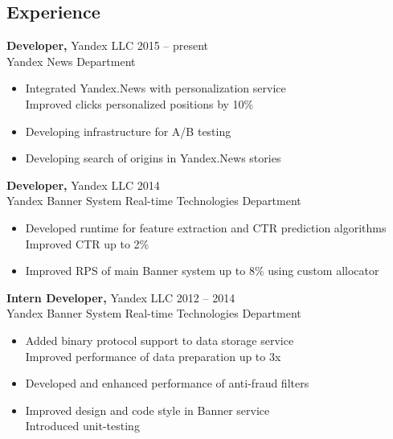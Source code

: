 \documentclass[margin]{res}
\begin{document}

\address{{\bf Contact info} \\ 1 Ambulatornyy pr-d, 5-2-40, Moscow, 125315  \\
+7 (915) 264-55-06 \\ tanyatik@yandex.ru, tanyatik1@gmail.com}


\begin{resume}



\section{Experience}
{\bf Developer,} Yandex LLC \hfill 2015 -- present \\
Yandex News Department
\begin{itemize} \itemsep -2pt \topsep 0ex
\item Integrated Yandex.News with personalization service \\
Improved clicks personalized positions by 10\%
\item Developing infrastructure for A/B testing
\item Developing search of origins in Yandex.News stories
\end{itemize}

 {\bf Developer,} Yandex LLC \hfill 2014 \\
Yandex Banner System Real-time Technologies Department
\begin{itemize} \itemsep -2pt \topsep 0ex
\item Developed runtime for feature extraction and CTR prediction algorithms \\
Improved CTR up to 2\%
\item Improved RPS of main Banner system up to 8\% using custom allocator
 \end{itemize}

 {\bf Intern Developer,} Yandex LLC \hfill 2012 -- 2014 \\
Yandex Banner System Real-time Technologies Department
\begin{itemize} \itemsep -2pt \topsep 0ex
\item Added binary protocol support to data storage service \\
Improved performance of data preparation up to 3x
\item Developed and enhanced performance of anti-fraud filters
\item Improved design and code style in Banner service \\
Introduced unit-testing
\end{itemize}


\end{resume}
\end{document}
